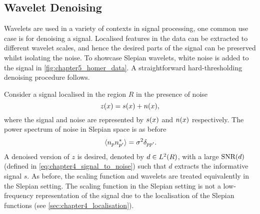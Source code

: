 





\subsection{Wavelet Denoising}\label{sec:chapter5_wavelet_denoising}

Wavelets are used in a variety of contexts in signal processing, one common use case is for denoising a signal.
Localised features in the data can be extracted to different wavelet scales, and hence the desired parts of the signal can be preserved whilst isolating the noise.
To showcase Slepian wavelets, white noise is added to the signal in \cref{fig:chapter5_homer_data}.
A straightforward hard-thresholding denoising procedure follows.

Consider a signal localised in the region \(R\) in the presence of noise
%
\begin{equation}\label{eq:chapter5_noised_signal}
	\mesh{z}
	= \mesh{s} + \mesh{n},
\end{equation}
%
where the signal and noise are represented by \(\mesh{s}\) and \(\mesh{n}\) respectively.
The power spectrum of noise in Slepian space is as before
%
\begin{equation}
	\expval*{\slepian{n} \conj{\slepian[']{n}}}
	= \sigma^{2} \delta_{pp'}.
\end{equation}
%
A denoised version of \(z\) is desired, denoted by \(d \in \hilbert{R}\), with a large \(\snr{d}\) (defined in \cref{eq:chapter4_signal_to_noise}) such that \(d\) extracts the informative signal \(s\).
As before, the scaling function and wavelets are treated equivalently in the Slepian setting.
The scaling function in the Slepian setting is not a low-frequency representation of the signal due to the localisation of the Slepian functions (see \cref{sec:chapter4_localisation}).

